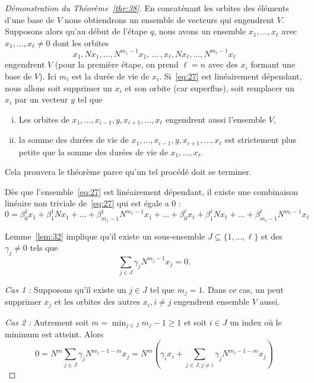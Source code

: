 \begin{proof}[Démonstration du Théorème~\ref{thr:38}] 
  En concaténant les orbites des éléments d'une base de $V$  nous obtiendrons un ensemble de vecteurs qui engendrent $V$. 
  Supposons alors qu'au début de l'étape $q$, nous avons un ensemble $x_1,\dots,x_\ell$ avec $x_1,\dots,x_\ell \neq0$  dont les orbites 
  \begin{equation}
    \label{eq:27}
    x_1,Nx_1,\dots,N^{m_1-1}x_1, \,\dots \, ,  x_\ell,Nx_\ell,\dots,N^{m_\ell-1}x_\ell
  \end{equation}
  engendrent $V$ (pour la première étape, on prend $\ell = n$ avec des $x_i$ formant une base de $V$). Ici $m_i$ est la durée de vie de $x_i$. Si~\eqref{eq:27} est linéairement dépendant, nous allons soit supprimer un $x_i$ et son orbite (car superflus), soit remplacer un $x_i$ par un vecteur $y$ tel que 
  \begin{enumerate}[i)]
  \item Les orbites de $x_1,\dots, x_{i-1},y,x_{i+1},\dots,x_{\ell}$ engendrent aussi l'ensemble  $V$, 
  \item la somme des durées de vie de $x_1,\dots, x_{i-1},y,x_{i+1},\dots,x_{\ell}$  est strictement plus petite que la somme des durées de vie de $x_1,\dots,x_{\ell}$. 
  \end{enumerate}
Cela prouvera le théorème parce qu'un tel procédé doit se terminer. 


\medskip
\noindent
Dès que l'ensemble~\eqref{eq:27} est linéairement dépendant, il existe une combinaison linéaire non triviale de~\eqref{eq:27} qui est égale a $0$ :
\begin{displaymath}
0 =   β_0^1 x_1 + β_1^1 Nx_1+ \dots+ β_{m_1-1}^1 N^{m_1-1}x_1 + \dots + 
β_0^\ell x_\ell + β_1^\ell Nx_\ell+ \dots+ β_{m_\ell-1}^\ell N^{m_\ell-1}x_\ell 
\end{displaymath}

\medskip
\noindent
Lemme~\ref{lem:32} implique qu'il existe un sous-ensemble $J ⊆ \{1,\dots,\ell \}$ et des $γ_j ≠ 0$ tels que 
\begin{displaymath}
  \sum_{j \in J} γ_j N^{m_j-1}x_j = 0.
\end{displaymath}

\noindent 
\emph{Cas 1 :} Supposons qu'il existe un $ j ∈ J$ tel que $m_j = 1$. Dans ce cas, un peut supprimer $x_j$  et les orbites des autres $x_i, i ≠j$ engendrent ensemble $V$ aussi. 

\medskip
\noindent 
\emph{Cas 2 :} 
Autrement 
soit $m = \min_{j \in J} {m_j-1} \geq 1$ et soit $i \in J$ un index où le minimum est atteint. Alors 
\begin{displaymath}
 0 =  N^m  \sum_{j \in J} γ_j N^{m_j-1 - m}x_j  = N^m \left( γ_i x_i + \sum_{j \in J, j \neq i} γ_j N^{m_j-1 - m}x_j \right)
\end{displaymath}


\end{proof}
